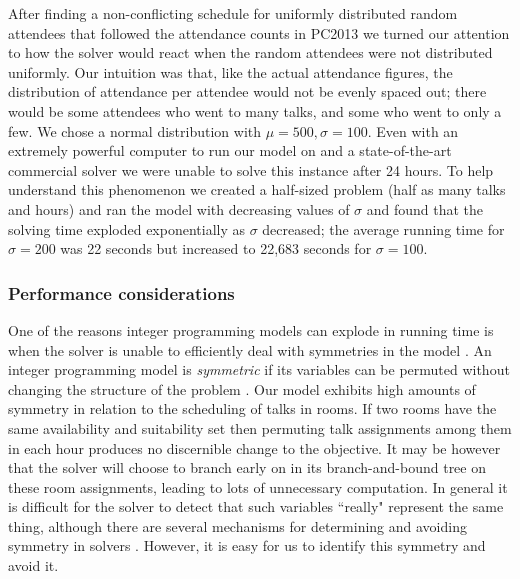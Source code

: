 \documentclass{svjour3}                     %
\begin{document}
After finding a non-conflicting schedule for uniformly distributed random attendees that followed the attendance counts in PC2013 we turned our attention to how the solver would react when the random attendees were not distributed uniformly. Our intuition was that, like the actual attendance figures, the distribution of attendance per attendee would not be evenly spaced out; there would be some attendees who went to many talks, and some who went to only a few. We chose a normal distribution with $\mu = 500, \sigma = 100$. Even with an extremely powerful computer to run our model on and a state-of-the-art commercial solver we were unable to solve this instance after 24 hours. To help understand this phenomenon we created a half-sized problem (half as many talks and hours) and ran the model with decreasing values of $\sigma$ and found that the solving time exploded exponentially as $\sigma$ decreased; the average running time for $\sigma = 200$ was 22 seconds but increased to 22,683 seconds for $\sigma = 100$.

\subsubsection{Performance considerations}
One of the reasons integer programming models can explode in running time is when the solver is unable to efficiently deal with symmetries in the model \cite{sherali}. An integer programming model is \emph{symmetric} if its variables can be permuted without changing the structure of the problem \cite{margot}. Our model exhibits high amounts of symmetry in relation to the scheduling of talks in rooms. If two rooms have the same availability and suitability set then permuting talk assignments among them in each hour produces no discernible change to the objective. It may be however that the solver will choose to branch early on in its branch-and-bound tree on these room assignments, leading to lots of unnecessary computation. In general it is difficult for the solver to detect that such variables ``really" represent the same thing, although there are several mechanisms for  determining and avoiding symmetry in solvers \cite{ostrowski}. However, it is easy for us to identify this symmetry and avoid it.
\end{document}
